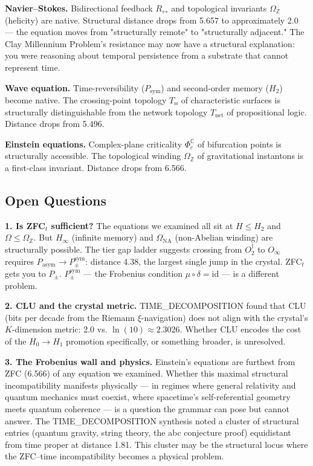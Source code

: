 \documentclass[12pt,a4paper]{article}
\begin{document}
\textbf{Navier--Stokes.} Bidirectional feedback $R_{\leftrightarrow}$ and topological invariants $\Omega_\mathbb{Z}$ (helicity) are native. Structural distance drops from 5.657 to approximately 2.0 --- the equation moves from "structurally remote" to "structurally adjacent." The Clay Millennium Problem's resistance may now have a structural explanation: you were reasoning about temporal persistence from a substrate that cannot represent time.

\textbf{Wave equation.} Time-reversibility ($P_\text{sym}$) and second-order memory ($H_2$) become native. The crossing-point topology $T_{\bowtie}$ of characteristic surfaces is structurally distinguishable from the network topology $T_\text{net}$ of propositional logic. Distance drops from 5.496.

\textbf{Einstein equations.} Complex-plane criticality $\Phi_c^\mathbb{C}$ of bifurcation points is structurally accessible. The topological winding $\Omega_\mathbb{Z}$ of gravitational instantons is a first-class invariant. Distance drops from 6.566.

\subsection{Open Questions}

\textbf{1. Is ZFC$_t$ sufficient?} The equations we examined all sit at $H \leq H_2$ and $\Omega \leq \Omega_\mathbb{Z}$. But $H_{\infty}$ (infinite memory) and $\Omega_\text{NA}$ (non-Abelian winding) are structurally possible. The tier gap ladder suggests crossing from $O_2^\dagger$ to $O_{\infty}$ requires $P_\text{asym} \to P_{\pm}^{\text{sym}}$: distance 4.38, the largest single jump in the crystal. ZFC$_t$ gets you to $P_{\pm}$. $P_{\pm}^{\text{sym}}$ --- the Frobenius condition $\mu \circ \delta = \text{id}$ --- is a different problem.

\textbf{2. CLU and the crystal metric.} TIME\_DECOMPOSITION found that CLU (bits per decade from the Riemann $\xi$-navigation) does not align with the crystal's $K$-dimension metric: 2.0 vs. $\ln(10) \approx 2.3026$. Whether CLU encodes the cost of the $H_0 \to H_1$ promotion specifically, or something broader, is unresolved.

\textbf{3. The Frobenius wall and physics.} Einstein's equations are furthest from ZFC (6.566) of any equation we examined. Whether this maximal structural incompatibility manifests physically --- in regimes where general relativity and quantum mechanics must coexist, where spacetime's self-referential geometry meets quantum coherence --- is a question the grammar can pose but cannot answer. The TIME\_DECOMPOSITION synthesis noted a cluster of structural entries (quantum gravity, string theory, the abc conjecture proof) equidistant from time proper at distance 1.81. This cluster may be the structural locus where the ZFC--time incompatibility becomes a physical problem.
\end{document}
